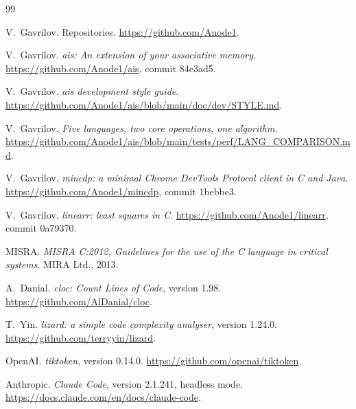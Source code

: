 \documentclass[11pt,a4paper]{article}
\begin{document}
\begin{thebibliography}{99}

V.~Gavrilov.
\newblock Repositories. \url{https://github.com/Anode1}.

V.~Gavrilov.
\newblock \emph{ais: An extension of your associative memory}.
\newblock \url{https://github.com/Anode1/ais}, commit 84e3ad5.

V.~Gavrilov.
\newblock \emph{ais development style guide}.
\newblock \url{https://github.com/Anode1/ais/blob/main/doc/dev/STYLE.md}.

V.~Gavrilov.
\newblock \emph{Five languages, two core operations, one algorithm}.
\newblock \url{https://github.com/Anode1/ais/blob/main/tests/perf/LANG_COMPARISON.md}.

V.~Gavrilov.
\newblock \emph{mincdp: a minimal Chrome DevTools Protocol client in C and Java}.
\newblock \url{https://github.com/Anode1/mincdp}, commit 1bebbe3.

V.~Gavrilov.
\newblock \emph{linearr: least squares in C}.
\newblock \url{https://github.com/Anode1/linearr}, commit 0a79370.

MISRA.
\newblock \emph{MISRA C:2012, Guidelines for the use of the C language in critical systems}.
\newblock MIRA Ltd., 2013.

A.~Danial.
\newblock \emph{cloc: Count Lines of Code}, version 1.98.
\newblock \url{https://github.com/AlDanial/cloc}.

T.~Yin.
\newblock \emph{lizard: a simple code complexity analyser}, version 1.24.0.
\newblock \url{https://github.com/terryyin/lizard}.

OpenAI.
\newblock \emph{tiktoken}, version 0.14.0.
\newblock \url{https://github.com/openai/tiktoken}.

Anthropic.
\newblock \emph{Claude Code}, version 2.1.241, headless mode.
\newblock \url{https://docs.claude.com/en/docs/claude-code}.

\end{thebibliography}
\end{document}
